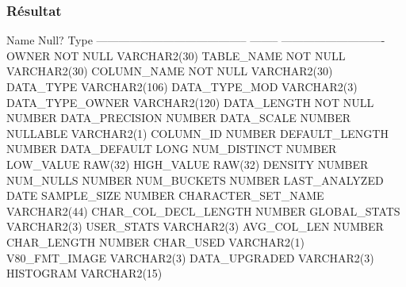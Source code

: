 \documentclass[•]{article}
\begin{document}
\subsubsection{Résultat}
\begin{sql}
 Name                                      Null?    Type
 ----------------------------------------- -------- ----------------------------
 OWNER                                     NOT NULL VARCHAR2(30)
 TABLE_NAME                                NOT NULL VARCHAR2(30)
 COLUMN_NAME                               NOT NULL VARCHAR2(30)
 DATA_TYPE                                          VARCHAR2(106)
 DATA_TYPE_MOD                                      VARCHAR2(3)
 DATA_TYPE_OWNER                                    VARCHAR2(120)
 DATA_LENGTH                               NOT NULL NUMBER
 DATA_PRECISION                                     NUMBER
 DATA_SCALE                                         NUMBER
 NULLABLE                                           VARCHAR2(1)
 COLUMN_ID                                          NUMBER
 DEFAULT_LENGTH                                     NUMBER
 DATA_DEFAULT                                       LONG
 NUM_DISTINCT                                       NUMBER
 LOW_VALUE                                          RAW(32)
 HIGH_VALUE                                         RAW(32)
 DENSITY                                            NUMBER
 NUM_NULLS                                          NUMBER
 NUM_BUCKETS                                        NUMBER
 LAST_ANALYZED                                      DATE
 SAMPLE_SIZE                                        NUMBER
 CHARACTER_SET_NAME                                 VARCHAR2(44)
 CHAR_COL_DECL_LENGTH                               NUMBER
 GLOBAL_STATS                                       VARCHAR2(3)
 USER_STATS                                         VARCHAR2(3)
 AVG_COL_LEN                                        NUMBER
 CHAR_LENGTH                                        NUMBER
 CHAR_USED                                          VARCHAR2(1)
 V80_FMT_IMAGE                                      VARCHAR2(3)
 DATA_UPGRADED                                      VARCHAR2(3)
 HISTOGRAM                                          VARCHAR2(15)


\end{sql}
\end{document}
